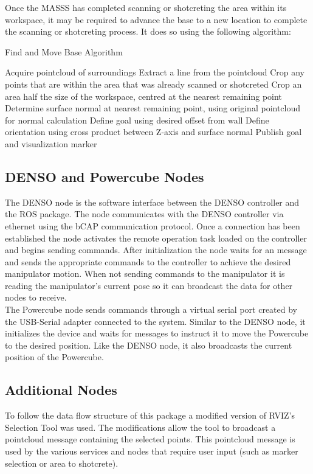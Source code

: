 Once the MASSS has completed scanning or shotcreting the area within its workspace, it may be required to advance the base to a new location to complete the scanning or shotcreting process. It does so using the following algorithm:

\begin{algorithm}[H]
\caption{Find and Move Base Algorithm}
\label{alg:findandmove}
\begin{algorithmic}[1]
\State Acquire pointcloud of surroundings
\State Extract a line from the pointcloud
\State Crop any points that are within the area that was already scanned or shotcreted
\State Crop an area half the size of the workspace, centred at the nearest remaining point
\State Determine surface normal at nearest remaining point, using original pointcloud for normal calculation
\State Define  goal using desired offset from wall
\State Define  orientation using cross product between Z-axis and surface normal
\State Publish  goal and visualization marker
\end{algorithmic}
\end{algorithm}

\subsection{DENSO and Powercube Nodes}
The DENSO node is the software interface between the DENSO controller and the ROS package. The node communicates with the DENSO controller via ethernet using the bCAP communication protocol. Once a connection has been established the node activates the remote operation task loaded on the controller and begins sending commands. After initialization the node waits for an  message and sends the appropriate commands to the controller to achieve the desired manipulator motion. When not sending commands to the manipulator it is reading the manipulator's current pose so it can broadcast the data for other nodes to receive.\\

The Powercube node sends commands through a virtual serial port created by the USB-Serial adapter connected to the system. Similar to the DENSO node, it initializes the device and waits for  messages to instruct it to move the Powercube to the desired position. Like the DENSO node, it also broadcasts the current position of the Powercube.\\
 
\subsection{Additional Nodes}
To follow the data flow structure of this package a modified version of RVIZ's Selection Tool was used. The modifications allow the tool to broadcast a pointcloud message containing the selected points. This pointcloud message is used by the various services and nodes that require user input (such as marker selection or area to shotcrete).\\

